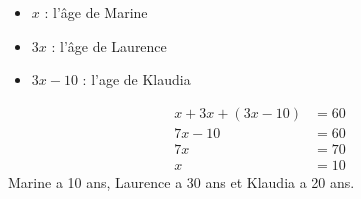 %
%
    \begin{itemize}[label=\faAngleRight]
        \item $x$ : l'âge de Marine
        \item $3x$ : l'âge de Laurence
        \item $3x-10$ : l'age de Klaudia
    \end{itemize}
    \begin{align*}
        x + 3x + (3x-10) & = 60 \\
        7x - 10          & = 60 \\
        7x               & = 70 \\
        x                & = 10
    \end{align*}
    Marine a 10 ans, Laurence a 30 ans et Klaudia a 20 ans.
